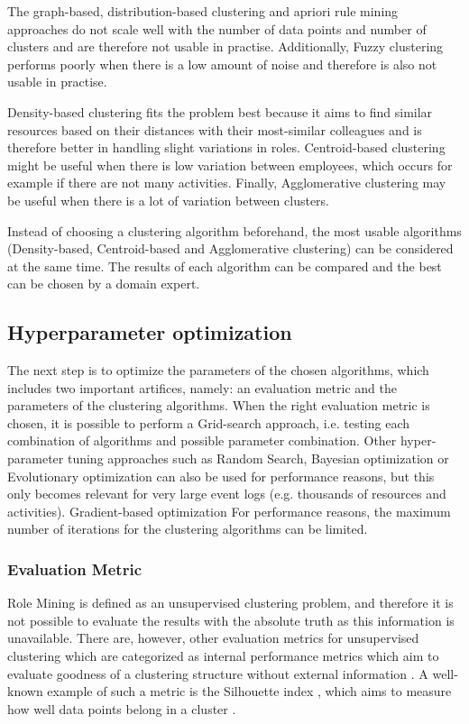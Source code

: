 
\noindent
The graph-based, distribution-based clustering and apriori rule mining approaches do not scale well with the number of data points and number of clusters and are therefore not usable in practise. Additionally, Fuzzy clustering performs poorly when there is a low amount of noise and therefore is also not usable in practise.

Density-based clustering fits the problem best because it aims to find similar resources based on their distances with their most-similar colleagues and is therefore better in handling slight variations in roles. Centroid-based clustering might be useful when there is low variation between employees, which occurs for example if there are not many activities. Finally, Agglomerative clustering may be useful when there is a lot of variation between clusters. 

Instead of choosing a clustering algorithm beforehand, the most usable algorithms (Density-based, Centroid-based and Agglomerative clustering) can be considered at the same time. The results of each algorithm can be compared and the best can be chosen by a domain expert.  

\subsection{Hyperparameter optimization}
The next step is to optimize the parameters of the chosen algorithms, which includes two important artifices, namely: an evaluation metric and the parameters of the clustering algorithms. When the right evaluation metric is chosen, it is possible to perform a Grid-search approach, i.e. testing each combination of algorithms and possible parameter combination. Other hyper-parameter tuning approaches such as Random Search, Bayesian optimization or Evolutionary optimization can also be used for performance reasons, but this only becomes relevant for very large event logs (e.g. thousands of resources and activities). Gradient-based optimization For performance reasons, the maximum number of iterations for the clustering algorithms can be limited. 

\subsubsection{Evaluation Metric}
Role Mining is defined as an unsupervised clustering problem, and therefore it is not possible to evaluate the results with the absolute truth as this information is unavailable. There are, however, other evaluation metrics for unsupervised clustering which are categorized as internal performance metrics which aim to evaluate goodness of a clustering structure without external information \cite{thalamuthu2006evaluation, dudoit2002prediction}. A well-known example of such a metric is the Silhouette index \cite{rousseeuw1987silhouettes}, which aims to measure how well data points belong in a cluster \cite{rousseeuw1987silhouettes}.

